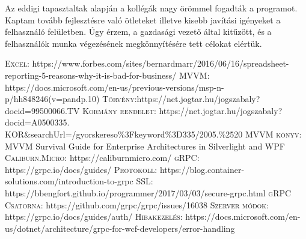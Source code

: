 \documentclass[
]{thesis-ekf}
\theoremstyle{definition}
\theoremstyle{remark}
\begin{document}
Az eddigi tapasztaltak alapján a kollégák nagy örömmel fogadták a programot. Kaptam tovább fejlesztésre való ötleteket illetve kisebb javítási igényeket a felhasználó felületben.  Úgy érzem, a gazdasági vezető által kitűzött, és a felhasználók munka végezésének megkönnyítésére tett célokat elértük.
\begin{thebibliography}{2}
\textsc{Excel: }https://www.forbes.com/sites/bernardmarr/2016/06/16/spreadsheet-reporting-5-reasons-why-it-is-bad-for-business/	
 \textsc{MVVM:} https://docs.microsoft.com/en-us/previous-versions/msp-n-p/hh848246(v=pandp.10)
\textsc{Törvény}:https://net.jogtar.hu/jogszabaly?docid=99500066.TV
\textsc{Kormány rendelet}: https://net.jogtar.hu/jogszabaly?docid=A0500335.
KOR\&searchUrl=/gyorskereso\%3Fkeyword\%3D335/2005.\%2520
\textsc{MVVM könyv: } MVVM Survival Guide for Enterprise Architectures in Silverlight and WPF
\textsc{Caliburn.Micro: }https://caliburnmicro.com/
\textsc{gRPC: }https://grpc.io/docs/guides/
\textsc{Protokoll: } https://blog.container-solutions.com/introduction-to-grpc
\textsc{SSL:} https://bbengfort.github.io/programmer/2017/03/03/secure-grpc.html
\textsc{gRPC Csatorna: } https://github.com/grpc/grpc/issues/16038
\textsc{Szerver módok:} https://grpc.io/docs/guides/auth/
\textsc{Hibakezelés:} https://docs.microsoft.com/en-us/dotnet/architecture/grpc-for-wcf-developers/error-handling


\end{thebibliography}
\end{document}
